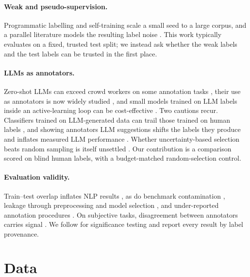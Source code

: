 \paragraph{Weak and pseudo-supervision.}
Programmatic labelling \citep{ratner2017snorkel} and self-training
\citep{lee2013pseudo,xie2020selftraining} scale a small seed to a
large corpus, and a parallel literature models the resulting label
noise \citep{arazo2021pseudo,northcutt2021}. This work typically
evaluates on a fixed, trusted test split; we instead ask whether the
weak labels and the test labels can be trusted in the first place.

\paragraph{LLMs as annotators.}
Zero-shot LLMs can exceed crowd workers on some annotation tasks
\citep{gilardi2023}, their use as annotators is now widely studied
\citep{ding2023,tan2024survey}, and small models trained on LLM
labels inside an active-learning loop can be cost-effective
\citep{zhang2023llmaaa}. Two cautions recur. Classifiers trained on
LLM-generated data can trail those trained on human labels
\citep{moller2024parrot}, and showing annotators LLM suggestions
shifts the labels they produce and inflates measured LLM performance
\citep{schroeder2025humanloop}. Whether uncertainty-based selection
beats random sampling is itself unsettled \citep{settles2009,lowell2019}.
Our contribution is a comparison scored on blind human labels, with a
budget-matched random-selection control.

\paragraph{Evaluation validity.}
Train--test overlap inflates NLP results \citep{elangovan2021}, as do
benchmark contamination \citep{sainz2023contamination,balloccu2024},
leakage through preprocessing and model selection
\citep{kapoor2023,cawley2010}, and under-reported annotation
procedures \citep{kunilovskaya2026,alkhalifa2026}. On subjective
tasks, disagreement between annotators carries signal
\citep{davani2022,plank2022}. We follow \citet{dror2018hitchhiker}
for significance testing and report every result by label provenance.

\section{Data}
\label{sec:data}

